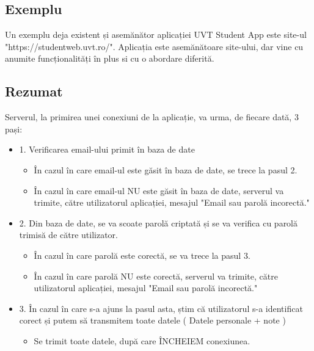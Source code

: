 \documentclass{article}
\begin{document}
		\subsection{Exemplu}
		\vspace{0.3cm}
			Un exemplu deja existent și asemănător aplicației UVT Student App este site-ul "https://studentweb.uvt.ro/". Aplicația este asemănătoare site-ului, dar vine cu anumite funcționalități în plus si cu o abordare diferită.

		\subsection{Rezumat}
		\vspace{0.3cm}
		Serverul, la primirea unei conexiuni de la aplicație, va urma, de fiecare dată, 3 pași:

		\begin{itemize}

			\item 1. Verificarea email-ului primit în baza de date
			\begin{itemize}
				\item În cazul în care email-ul este găsit în baza de date, se trece la pasul 2.
				\item În cazul în care email-ul NU este găsit în baza de date, serverul va trimite, către utilizatorul aplicației, mesajul "Email sau parolă incorectă."\\
			\end{itemize}

			\item 2. Din baza de date, se va scoate parolă criptată și se va verifica cu parolă trimisă de către utilizator.
			\begin{itemize}
				\item În cazul în care parolă este corectă, se va trece la pasul 3.
				\item În cazul în care parolă NU este corectă, serverul va trimite, către utilizatorul aplicației, mesajul "Email sau parolă incorectă."
			\end{itemize}

			\item 3. În cazul în care s-a ajuns la pasul asta, știm că utilizatorul s-a identificat corect și putem să transmitem toate datele ( Datele personale + note )
			\begin{itemize}
				\item Se trimit toate datele, după care ÎNCHEIEM conexiunea.
			\end{itemize}
		\end{itemize}
\end{document}
